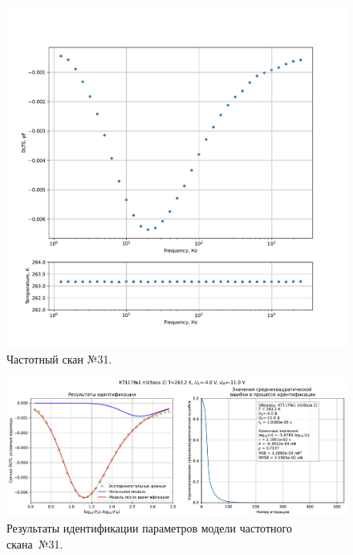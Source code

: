 \begin{figure}[!ht]
    \centering
    \includegraphics[width=1\textwidth]{../plots/КТ117№1_п1(база 2)_2500Гц-1Гц_1пФ_-10С_-4В-11В_100мВ_20мкс_шаг_0,1.pdf}
    \caption{Частотный скан №31.}
    \label{pic:frequency_scan_31}
\end{figure}

\begin{figure}[!ht]
    \centering
    \includegraphics[width=1\textwidth]{../plots/КТ117№1_п1(база 2)_2500Гц-1Гц_1пФ_-10С_-4В-11В_100мВ_20мкс_шаг_0,1_model.pdf}
    \caption{Результаты идентификации параметров модели частотного скана~№31.}
    \label{pic:frequency_scan_model31}
\end{figure}

\pagebreak


